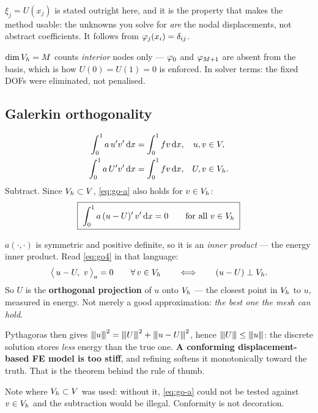 \begin{mechanics}
$\xi_{j}=U(x_{j})$ is stated outright here, and it is the property that makes
the method usable: the unknowns you solve for \emph{are} the nodal
displacements, not abstract coefficients. It follows from
$\varphi_{j}(x_{i})=\delta_{ij}$.

$\dim V_{h}=M$ counts \emph{interior} nodes only --- $\varphi_{0}$ and $\varphi_{M+1}$
are absent from the basis, which is how $U(0)=U(1)=0$ is enforced. In solver
terms: the fixed DOFs were eliminated, not penalised.
\end{mechanics}

\subsection*{Galerkin orthogonality}

\begin{align}
  \int_{0}^{1}a\,u'v'\,\mathrm{d} x &= \int_{0}^{1}fv\,\mathrm{d} x, & u,v&\in V, \label{eq:go-a}\\
  \int_{0}^{1}a\,U'v'\,\mathrm{d} x &= \int_{0}^{1}fv\,\mathrm{d} x, & U,v&\in V_{h}. \label{eq:go-b}
\end{align}
Subtract. Since $V_{h}\subset V$, \eqref{eq:go-a} also holds for $v\in V_{h}$:
\begin{equation}\label{eq:go4}
  \boxed{\;\int_{0}^{1} a\,(u-U)'\,v'\,\mathrm{d} x = 0 \qquad\text{for all } v\in V_{h}\;}
\end{equation}

\begin{intuition}
$a(\cdot,\cdot)$ is symmetric and positive definite, so it is an \emph{inner
product} --- the energy inner product. Read \eqref{eq:go4} in that language:
\[
  \bigl\langle\, u-U,\ v \,\bigr\rangle_{a} = 0 \qquad \forall\, v\in V_{h}
  \qquad\Longleftrightarrow\qquad
  (u-U) \perp V_{h} .
\]
So $U$ is the \textbf{orthogonal projection} of $u$ onto $V_{h}$ --- the closest
point in $V_{h}$ to $u$, measured in energy. Not merely a good approximation:
\emph{the best one the mesh can hold}.

Pythagoras then gives
${\left\vert\kern-0.25ex\left\vert\kern-0.25ex\left\vert u \right\vert\kern-0.25ex\right\vert\kern-0.25ex\right\vert}^{2}={\left\vert\kern-0.25ex\left\vert\kern-0.25ex\left\vert U \right\vert\kern-0.25ex\right\vert\kern-0.25ex\right\vert}^{2}+{\left\vert\kern-0.25ex\left\vert\kern-0.25ex\left\vert u-U \right\vert\kern-0.25ex\right\vert\kern-0.25ex\right\vert}^{2}$, hence ${\left\vert\kern-0.25ex\left\vert\kern-0.25ex\left\vert U \right\vert\kern-0.25ex\right\vert\kern-0.25ex\right\vert}\le{\left\vert\kern-0.25ex\left\vert\kern-0.25ex\left\vert u \right\vert\kern-0.25ex\right\vert\kern-0.25ex\right\vert}$:
the discrete solution stores \emph{less} energy than the true one.
\textbf{A conforming displacement-based FE model is too stiff}, and refining
softens it monotonically toward the truth. That is the theorem behind the rule
of thumb.

Note where $V_{h}\subset V$ was used: without it, \eqref{eq:go-a} could not be
tested against $v\in V_{h}$ and the subtraction would be illegal. Conformity is
not decoration.
\end{intuition}

